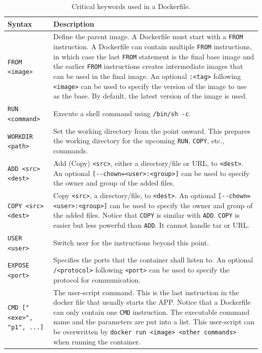 \begin{table}
	\centering \caption{Critical keywords used in a Dockerfile.}\label{ch:vac:tab:keywordsdockerfile}
	\begin{tabularx}{\textwidth}{lX}
		\hline
		Syntax & Description \\ \hline
		\verb|FROM <image>| & Define the parent image. A Dockerfile must start with a \verb|FROM| instruction. A Dockerfile can contain multiple \verb|FROM| instructions, in which case the last \verb|FROM| statement is the final base image and the earlier \verb|FROM| instructions creates intermediate images that can be used in the final image. An optional \verb|:<tag>| following \verb|<image>| can be used to specify the version of the image to use as the base. By default, the latest version of the image is used. \\ 
		\verb|RUN <command>| & Execute a shell command using \verb|/bin/sh -c|. \\ 
		\verb|WORKDIR <path>| & Set the working directory from the point onward. This prepares the working directory for the upcoming \verb|RUN|, \verb|COPY|, etc., commands. \\ 
		\verb|ADD <src> <dest>| & Add (Copy) \verb|<src>|, either a directory/file or URL, to \verb|<dest>|. An optional \verb|[--chown=<user>:<group>]| can be used to specify the owner and group of the added files. \\ 
		\verb|COPY <src> <dest>| & Copy \verb|<src>|, a directory/file, to \verb|<dest>|. An optional \verb|[--chown=<user>:<group>]| can be used to specify the owner and group of the added files. Notice that \verb|COPY| is similar with \verb|ADD|. \verb|COPY| is easier but less powerful than \verb|ADD|. It cannot handle tar or URL. \\ 
		\verb|USER <user>| & Switch user for the instructions beyond this point. \\ 
		\verb|EXPOSE <port>| & Specifies the ports that the container shall listen to. An optional \verb|/<protocol>| following \verb|<port>| can be used to specify the protocol for communication. \\ 
		\verb|CMD ["<exe>", "p1", ...]| & The user-script command. This is the last instruction in the docker file that usually starts the APP. Notice that a Dockerfile can only contain one \verb|CMD| instruction. The executable command name and the parameters are put into a list. This user-script can be overwritten by \texttt{docker run <image> <other commands>} when running the container. \\
		\hline
	\end{tabularx}
\end{table}

